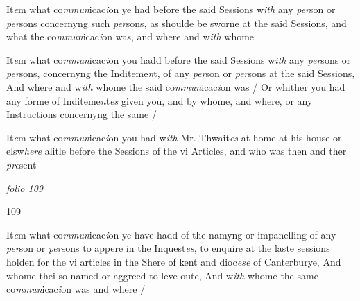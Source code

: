 \documentclass[12pt, a4paper]{book}
\begin{document}
				\marginpar[\vspace{0.5cm}{\textcolor{Gray}{13}}]{}
			
		\ifthenelse{\isodd{\thepage}}
		{\reversemarginpar}
		{\normalmarginpar}
		 It\textit{e}m what co\textit{mmun}icac\textit{i}on ye had before the said Sessions w\textit{ith} any
 \textit{per}son or \textit{per}sons concernyng such \textit{per}sons, as shoulde be sworne
 at the said Sessions, and what the co\textit{mmun}icac\textit{i}on was, and
 where and w\textit{ith} whome
 




				\marginpar[\vspace{0.5cm}{\textcolor{Gray}{14}}]{}
			
		\ifthenelse{\isodd{\thepage}}
		{\reversemarginpar}
		{\normalmarginpar}
		 It\textit{e}m what co\textit{mmun}icac\textit{i}on you hadd before the said Sessions w\textit{ith} any
 \textit{per}sons or \textit{per}sons, concernyng the Inditeme\textit{n}t, of any \textit{per}son
 or \textit{per}sons at the said Sessions, And where and w\textit{ith} whome
 the said co\textit{mmun}icac\textit{i}on was / Or whither you had any forme of
 Inditeme\textit{n}t\textit{es} given you, and by whome, and where, or any
 Instructions concernyng the same /
 



	
				\marginpar[\vspace{0.5cm}{\textcolor{Gray}{15}}]{}
			
		\ifthenelse{\isodd{\thepage}}
		{\reversemarginpar}
		{\normalmarginpar}
		 It\textit{e}m what co\textit{mmun}icac\textit{i}on you had w\textit{ith} Mr. Thwait\textit{es} 
	at home at his house or elsw\textit{here}
			 alitle before the
 Sessions of the vi Articles, and who was then and ther
 \textit{pre}sent

\dotfill
						\newpage
{}

\textit{folio 109}


\begin{flushright}{\color{Mahogany}109}\end{flushright}
 



				\marginpar[\vspace{0.5cm}{\textcolor{Gray}{16}}]{}
			
		\ifthenelse{\isodd{\thepage}}
		{\reversemarginpar}
		{\normalmarginpar}
		 It\textit{e}m what co\textit{mmun}icac\textit{i}on ye have hadd of the namyng or impanelling
 of any \textit{per}son or \textit{per}sons to appere in the Inquest\textit{es}, to enquire at
 the laste sessions holden for the vi articles in the Shere of kent
	and dioc\textit{ese} of Canterburye, And whome thei so named or
 aggreed to leve oute, And w\textit{ith} whome the same co\textit{mmun}icac\textit{i}on was
 and where /
 
\end{document}
